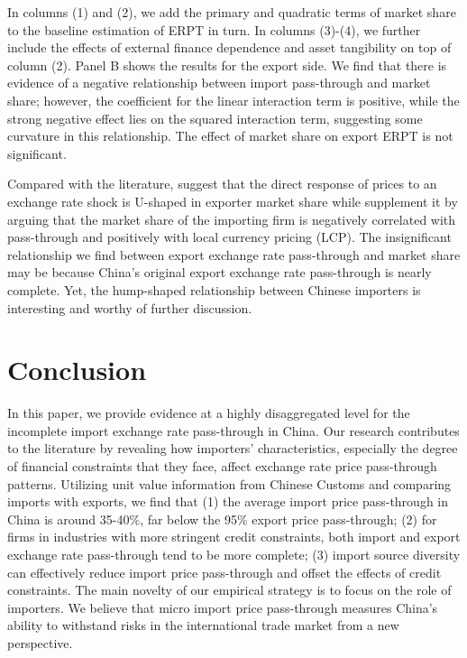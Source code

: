 \documentclass[12pt]{article}
\begin{document}
In columns (1) and (2), we add the primary and quadratic terms of market share to the baseline estimation of ERPT in turn. In columns (3)-(4), we further include the effects of external finance dependence and asset tangibility on top of column (2). Panel B shows the results for the export side. We find that there is evidence of a negative relationship between import pass-through and market share; however, the coefficient for the linear interaction term is positive, while the strong negative effect lies on the squared interaction term, suggesting some curvature in this relationship. The effect of market share on export ERPT is not significant. 

Compared with the literature, \cite{auer2016} suggest that the direct response of prices to an exchange rate shock is U-shaped in exporter market share while \cite{devereux2017} supplement it by arguing that the market share of the importing firm is negatively correlated with pass-through and positively with local currency pricing (LCP). The insignificant relationship we find between export exchange rate pass-through and market share may be because China's original export exchange rate pass-through is nearly complete. Yet, the hump-shaped relationship between Chinese importers is interesting and worthy of further discussion.

\section{Conclusion}\label{Conclusion}

In this paper, we provide evidence at a highly disaggregated level for the incomplete import exchange rate pass-through in China. Our research contributes to the literature by revealing how importers' characteristics, especially the degree of financial constraints that they face, affect exchange rate price pass-through patterns. Utilizing unit value information from Chinese Customs and comparing imports with exports, we find that (1) the average import price pass-through in China is around 35-40\%, far below the 95\% export price pass-through; (2) for firms in industries with more stringent credit constraints, both import and export exchange rate pass-through tend to be more complete; (3) import source diversity can effectively reduce import price pass-through and offset the effects of credit constraints. The main novelty of our empirical strategy is to focus on the role of importers. We believe that micro import price pass-through measures China's ability to withstand risks in the international trade market from a new perspective.
\end{document}

